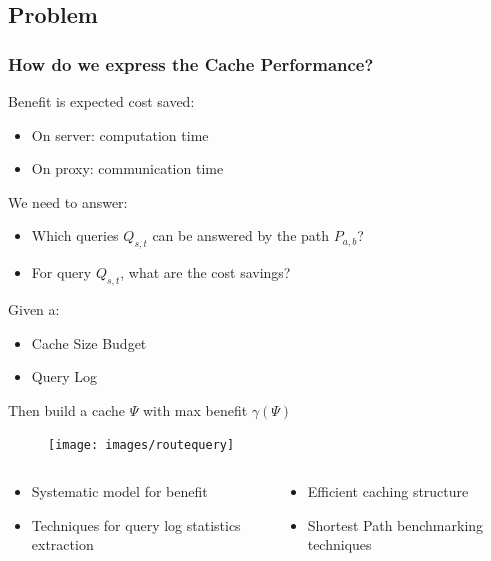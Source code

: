\subsection{Problem}
\begin{frame}[red] %
\frametitle{How do we express the Cache Performance?}

  Benefit is expected cost saved:
    \begin{itemize}
    \item On server: computation time
    \item On proxy: communication time
    \end{itemize}

\vspace{1.5em}

We need to answer:
\begin{itemize}
    \item Which queries $Q_{s,t}$ can be answered by the path $P_{a,b}$?
    \item For query $Q_{s,t}$, what are the cost savings?
\end{itemize}

\vspace{1.5em}
  Given a: 
    \begin{itemize}
    \item Cache Size Budget 
    \item Query Log
    \end{itemize}
  Then build a cache $\Psi$ with max benefit $\gamma(\Psi)$\\
\end{frame}


\begin{frame}[color=red] %
    \begin{figure}
    \texttt{[image: images/routequery]} 
    \
    \end{figure}

\begin{columns}
  \begin{column}{0.5\textwidth}
    \vspace{-0.8em}
    \begin{itemize}
    \itemsep -2pt
      \item Systematic model for benefit
      \item Techniques for query log statistics extraction 
    \end{itemize}
  \end{column}
  \begin{column}{0.6\textwidth}
    \vspace{-1.3em}
    \begin{itemize}
     \itemsep -2pt
      \item Efficient caching structure
      \item Shortest Path benchmarking techniques
    \end{itemize}
  \end{column}
\end{columns}
\end{frame}




